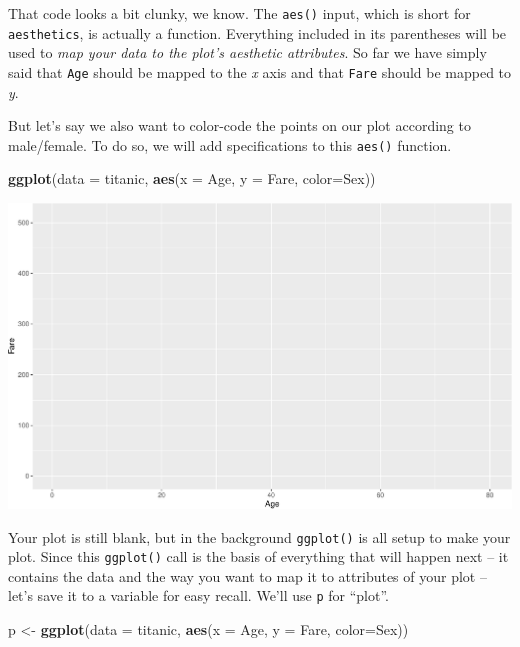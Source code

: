\documentclass[
]{book}
\newenvironment{Shaded}{\begin{snugshade}}{\end{snugshade}}
\newcommand{\DataTypeTok}[1]{\textcolor[rgb]{0.13,0.29,0.53}{#1}}
\newcommand{\KeywordTok}[1]{\textcolor[rgb]{0.13,0.29,0.53}{\textbf{#1}}}
\newcommand{\NormalTok}[1]{#1}
\newcommand{\StringTok}[1]{\textcolor[rgb]{0.31,0.60,0.02}{#1}}
\begin{document}
That code looks a bit clunky, we know. The \texttt{aes()} input, which is short for \texttt{aesthetics}, is actually a function. Everything included in its parentheses will be used to \emph{map your data to the plot's aesthetic attributes}. So far we have simply said that \texttt{Age} should be mapped to the \emph{x} axis and that \texttt{Fare} should be mapped to \emph{y}.

But let's say we also want to color-code the points on our plot according to male/female. To do so, we will add specifications to this \texttt{aes()} function.

\begin{Shaded}
\begin{Highlighting}[]
\KeywordTok{ggplot}\NormalTok{(}\DataTypeTok{data =}\NormalTok{ titanic, }
       \KeywordTok{aes}\NormalTok{(}\DataTypeTok{x =}\NormalTok{ Age, }\DataTypeTok{y =}\NormalTok{ Fare, }\DataTypeTok{color=}\NormalTok{Sex))}
\end{Highlighting}
\end{Shaded}

\includegraphics{figures/unnamed-chunk-248-1.pdf}

Your plot is still blank, but in the background \texttt{ggplot()} is all setup to make your plot. Since this \texttt{ggplot()} call is the basis of everything that will happen next -- it contains the data and the way you want to map it to attributes of your plot -- let's save it to a variable for easy recall. We'll use \texttt{p} for ``plot''.

\begin{Shaded}
\begin{Highlighting}[]
\NormalTok{p <-}\StringTok{ }\KeywordTok{ggplot}\NormalTok{(}\DataTypeTok{data =}\NormalTok{ titanic, }
       \KeywordTok{aes}\NormalTok{(}\DataTypeTok{x =}\NormalTok{ Age, }\DataTypeTok{y =}\NormalTok{ Fare, }\DataTypeTok{color=}\NormalTok{Sex))}
\end{Highlighting}
\end{Shaded}
\end{document}
